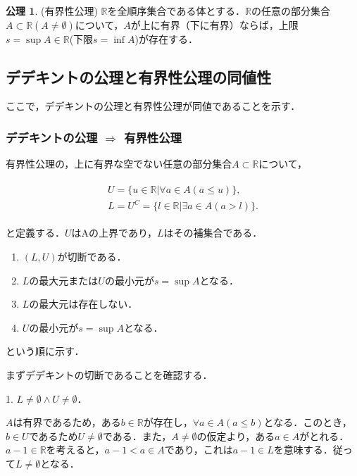 \documentclass[oneside,openany]{jbook}
\theoremstyle{definition}
\newtheorem{axiom}{公理}
\begin{document}
\begin{axiom}{(有界性公理)}
$\mathbb{R}$を全順序集合である体とする．$\mathbb{R}$の任意の部分集合$A \subset \mathbb{R} (A \neq \emptyset)$について，$A$が上に有界（下に有界）ならば，上限$s = \sup A \in \mathbb{R}$(下限$s = \inf A$)が存在する．
\end{axiom}


\subsection{デデキントの公理と有界性公理の同値性}
ここで，デデキントの公理と有界性公理が同値であることを示す．

\subsubsection{デデキントの公理 $\Rightarrow$ 有界性公理}
有界性公理の，上に有界な空でない任意の部分集合$A \subset \mathbb{R}$について，

\begin{align}
\begin{split}
U = \{ u \in  \mathbb{R} | \forall a \in A ( a \leq u) \},\\
L = U^{C} = \{ l \in \mathbb{R} | \exists a \in A ( a > l) \}.
\end{split}
\end{align}

と定義する．$U$はAの上界であり，$L$はその補集合である．

\begin{enumerate}
\item $(L, U)$が切断である．
\item $L$の最大元または$U$の最小元が$s = \sup A$となる．
\item $L$の最大元は存在しない．
\item $U$の最小元が$s = \sup A$となる．
\end{enumerate}

という順に示す．

まずデデキントの切断であることを確認する．

1. $L \neq \emptyset \land U \neq \emptyset$．

$A$は有界であるため，ある$b \in \mathbb{R}$が存在し，$\forall a \in A (a \leq b)$となる．このとき，$b \in U$であるため$U \neq \emptyset$である．また，$A \neq \emptyset$の仮定より，ある$a \in A$がとれる．$a-1 \in \mathbb{R}$を考えると，$a-1 < a \in A$であり，これは$a-1 \in L$を意味する．従って$L \neq \emptyset$となる．
\end{document}
